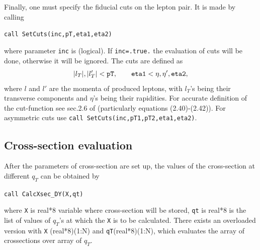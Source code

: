\documentclass[prd,nofootinbib,eqsecnum,final]{revtex4}
\renewcommand{\(}{\left(}
\renewcommand{\)}{\right)}
\renewcommand{\[}{\left[}
\renewcommand{\]}{\right]}
\begin{document}
Finally, one must specify the fiducial cuts on the lepton pair. It is made by calling

\texttt{call SetCuts(inc,pT,eta1,eta2)}

where parameter \texttt{inc} is (logical). If \texttt{inc=.true.} the evaluation of cuts will be done, otherwise it will be ignored. The cuts are defined as
\begin{eqnarray}
|l_T|,|l'_T|<\text{\texttt{pT}},\qquad \text{\texttt{eta1}}<\eta,\eta',\text{\texttt{eta2}},
\end{eqnarray}
where $l$ and $l'$ are the momenta of produced leptons, with $l_T$'s being their transverse components and $\eta$'s being their rapidities. For accurate definition of the cut-function see sec.2.6 of \cite{Scimemi:2017etj} (particularly equations (2.40)-(2.42)). For asymmetric cuts use \texttt{call SetCuts(inc,pT1,pT2,eta1,eta2)}.

\subsection{Cross-section evaluation}
\label{TMDX:xsec}

After the parameters of cross-section are set up, the values of the cross-section at different $q_T$ can be obtained by

\texttt{call CalcXsec\_DY(X,qt)}

where  \texttt{X} is real*8 variable where cross-section will be stored, \texttt{qt} is real*8 is the list of values of $q_T$'s at which the \texttt{X} is to be calculated. There exists an overloaded version with \texttt{X} (real*8)(1:N) and \texttt{qT}(real*8)(1:N), which evaluates the array of crossections over array of $q_T$.
\end{document}
